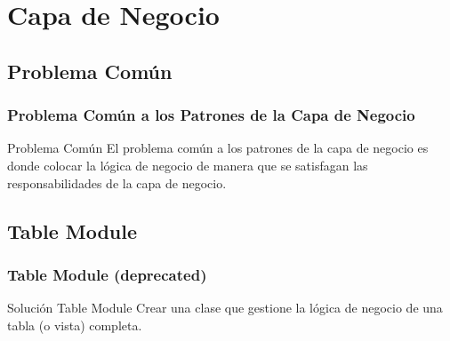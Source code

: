 \documentclass[a4paper,slidestop,xcolor=pst,dvips,blue]{beamer}
\begin{document}
%

\section{Capa de Negocio}

\subsection{Problema Común}

\begin{frame}
    \frametitle{Problema Común a los Patrones de la Capa de Negocio}
    \begin{block}{Problema Común}
        El problema común a los patrones de la capa de negocio es donde colocar la
        lógica de negocio de manera que se satisfagan las responsabilidades de la capa de negocio.
    \end{block}
\end{frame}

\subsection{Table Module}

\begin{frame}[c]
    \frametitle{Table Module (deprecated)}
    \begin{block}{Solución Table Module}
        Crear una clase que gestione la lógica de negocio de una tabla (o vista) completa.
    \end{block}
\end{frame}
\end{document}
